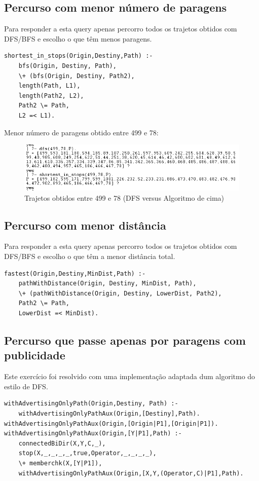 \documentclass[20pt]{article}
\begin{document}
\newpage
\subsection{Percurso com menor número de paragens}
Para responder a esta query apenas percorro todos os trajetos obtidos com DFS/BFS e escolho o que têm menos paragens.

\begin{verbatim}
shortest_in_stops(Origin,Destiny,Path) :- 
    bfs(Origin, Destiny, Path),
    \+ (bfs(Origin, Destiny, Path2),
    length(Path, L1),
    length(Path2, L2),
    Path2 \= Path,
    L2 =< L1).    
\end{verbatim}

Menor número de paragens obtido entre 499 e 78:
 \vspace{1cm}
\begin{figure}[h]
    \centering
    \includegraphics[scale=0.8]{images/less_stops_499_78.png}
    \caption{Trajetos obtidos entre 499 e 78 (DFS versus Algoritmo de cima)}
\end{figure}

\newpage
\subsection{Percurso com menor distância}
Para responder a esta query apenas percorro todos os trajetos obtidos com DFS/BFS e escolho o que têm a menor distância total.

\begin{verbatim}
fastest(Origin,Destiny,MinDist,Path) :- 
    pathWithDistance(Origin, Destiny, MinDist, Path),
    \+ (pathWithDistance(Origin, Destiny, LowerDist, Path2),
    Path2 \= Path,
    LowerDist =< MinDist). 
\end{verbatim} 

\newpage
\subsection{Percurso que passe apenas por paragens com publicidade}
Este exercício foi resolvido com uma implementação adaptada dum algoritmo do estilo de DFS.

\begin{verbatim}
withAdvertisingOnlyPath(Origin,Destiny, Path) :-    
    withAdvertisingOnlyPathAux(Origin,[Destiny],Path).
withAdvertisingOnlyPathAux(Origin,[Origin|P1],[Origin|P1]).
withAdvertisingOnlyPathAux(Origin,[Y|P1],Path) :-   
    connectedBiDir(X,Y,C,_),
    stop(X,_,_,_,_,true,Operator,_,_,_,_),
    \+ memberchk(X,[Y|P1]), 
    withAdvertisingOnlyPathAux(Origin,[X,Y,(Operator,C)|P1],Path).      
\end{verbatim}
\end{document}

